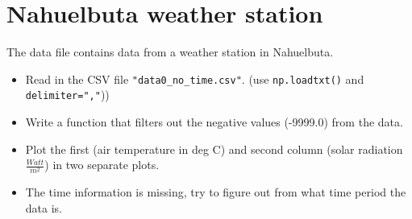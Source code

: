 \section{Nahuelbuta weather station}

The data file contains data from a weather station in Nahuelbuta.

\begin{itemize}
    \item Read in the CSV file \verb|"data0_no_time.csv"|. (use \verb|np.loadtxt()| and \verb|delimiter=","|))
    \item Write a function that filters out the negative values (-9999.0) from the data.
    \item Plot the first (air temperature in deg C) and second column (solar radiation $\frac{Watt}{m^2}$) in two separate plots.
    \item The time information is missing, try to figure out from what time period the data is.
\end{itemize}
